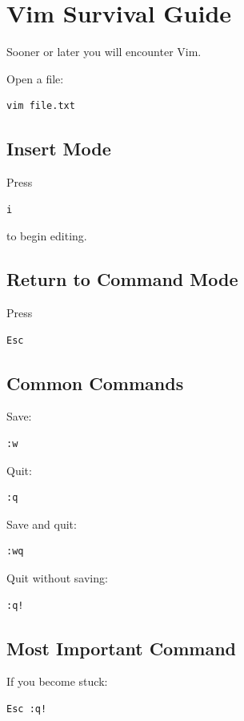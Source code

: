 \section{Vim Survival Guide} 

Sooner or later you will encounter Vim. 

Open a file: 

\begin{lstlisting} 
vim file.txt 
\end{lstlisting} 

\subsection{Insert Mode} 

Press 

\begin{lstlisting} 
i 
\end{lstlisting} 

to begin editing. 

\subsection{Return to Command Mode} 

Press 

\begin{lstlisting} 
Esc 
\end{lstlisting} 

\subsection{Common Commands} 

Save: 

\begin{lstlisting} 
:w 
\end{lstlisting} 

Quit: 

\begin{lstlisting} 
:q 
\end{lstlisting} 

Save and quit: 

\begin{lstlisting} 
:wq 
\end{lstlisting} 

Quit without saving: 

\begin{lstlisting} 
:q! 
\end{lstlisting} 

\subsection{Most Important Command} 

If you become stuck: 

\begin{lstlisting} 
Esc :q! 
\end{lstlisting}